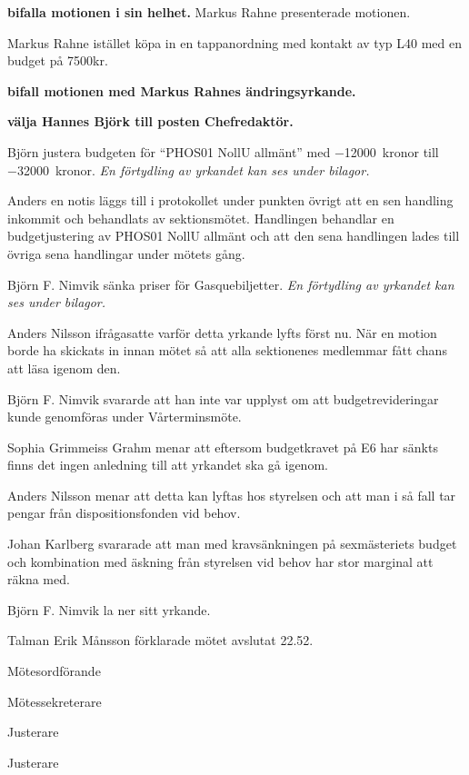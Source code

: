 \documentclass[10pt]{article}
\def\mo{Erik Månsson}
\def\ms{Axel Voss}
\def\ji{Henrik Ramström}
\def\jii{Pontus Landgren}
\begin{document}
\begin{paragrafer}
\begin{paragrafer}
		\textbf{\Mba bifalla motionen i sin helhet.}
		Markus Rahne presenterade motionen.

		Markus Rahne \ypa istället köpa in en tappanordning med kontakt av typ L40 med en budget på 7500kr.

		\textbf{\Mba bifall motionen med Markus Rahnes ändringsyrkande.}
	\end{paragrafer}
	\textbf{\Mba välja Hannes Björk till posten Chefredaktör.}

	Björn \ypa justera budgeten för ``PHOS01 NollU allmänt'' med \SI{-12000}{kronor} till \SI{-32000}{kronor}. \emph{En förtydling av yrkandet kan ses under bilagor.} 

	Anders \ypa en notis läggs till i protokollet under punkten övrigt att en sen handling inkommit och behandlats av sektionsmötet.
	Handlingen behandlar en budgetjustering av PHOS01 NollU allmänt och att den sena handlingen lades till övriga sena handlingar under mötets gång.

	\textbf{\Mbabay}

	Björn F. Nimvik \ypa sänka priser för Gasquebiljetter. \emph{En förtydling av yrkandet kan ses under bilagor.} 

	Anders Nilsson ifrågasatte varför detta yrkande lyfts först nu. När en motion borde ha skickats in innan mötet så att alla sektionenes medlemmar fått chans att läsa igenom den.

	Björn F. Nimvik svararde att han inte var upplyst om att budgetrevideringar kunde genomföras under Vårterminsmöte.

	Sophia Grimmeiss Grahm menar att eftersom budgetkravet på E6 har sänkts finns det ingen anledning till att yrkandet ska gå igenom.

	Anders Nilsson menar att detta kan lyftas hos styrelsen och att man i så fall tar pengar från dispositionsfonden vid behov.

	Johan Karlberg svararade att man med kravsänkningen på sexmästeriets budget och kombination med äskning från styrelsen vid behov har stor marginal att räkna med.

	Björn F. Nimvik la ner sitt yrkande. 

	Talman {\mo} förklarade mötet avslutat 22.52.

\end{paragrafer}
\hidesignfoot
\begin{signatures}{4}
	\signature{\mo}{Mötesordförande}
	\signature{\ms}{Mötessekreterare}
	\signature{\ji}{Justerare}
	\signature{\jii}{Justerare}
\end{signatures}
\newpage
\end{document}

